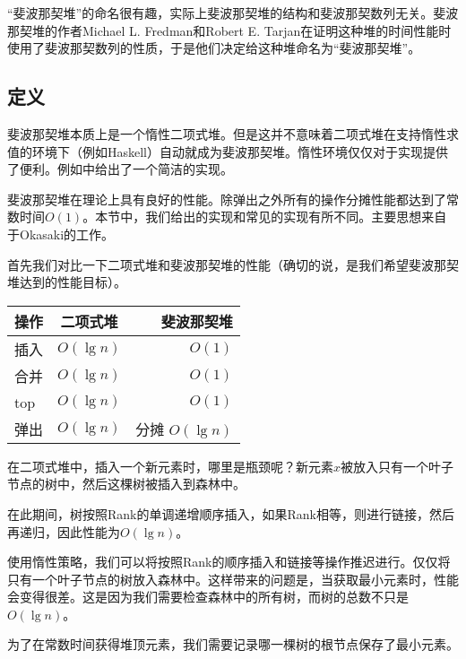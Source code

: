 \documentclass[UTF8]{article}
\begin{document}
“斐波那契堆”的命名很有趣，实际上斐波那契堆的结构和斐波那契数列无关。斐波那契堆的作者Michael L. Fredman和Robert E. Tarjan在证明这种堆的时间性能时使用了斐波那契数列的性质，于是他们决定给这种堆命名为“斐波那契堆”\cite{CLRS}。

\subsection{定义}

斐波那契堆本质上是一个惰性二项式堆。但是这并不意味着二项式堆在支持惰性求值的环境下（例如Haskell）自动就成为斐波那契堆。惰性环境仅仅对于实现提供了便利。例如\cite{hackage-fibq}中给出了一个简洁的实现。

斐波那契堆在理论上具有良好的性能。除弹出之外所有的操作分摊性能都达到了常数时间$O(1)$。本节中，我们给出的实现和常见的实现\cite{CLRS}有所不同。主要思想来自于Okasaki的工作\cite{okasaki-fibh}。

首先我们对比一下二项式堆和斐波那契堆的性能（确切的说，是我们希望斐波那契堆达到的性能目标）。

\begin{tabular}{l | c | r}
  \hline
  操作 & 二项式堆 & 斐波那契堆 \\
  \hline
  插入 & $O(\lg n)$ & $O(1)$ \\
  合并 & $O(\lg n)$ & $O(1)$ \\
  top & $O(\lg n)$ & $O(1)$ \\
  弹出 & $O(\lg n)$ & 分摊 $O(\lg n)$ \\
  \hline
\end{tabular}

在二项式堆中，插入一个新元素时，哪里是瓶颈呢？新元素$x$被放入只有一个叶子节点的树中，然后这棵树被插入到森林中。

在此期间，树按照Rank的单调递增顺序插入，如果Rank相等，则进行链接，然后再递归，因此性能为$O(\lg n)$。

使用惰性策略，我们可以将按照Rank的顺序插入和链接等操作推迟进行。仅仅将只有一个叶子节点的树放入森林中。这样带来的问题是，当获取最小元素时，性能会变得很差。这是因为我们需要检查森林中的所有树，而树的总数不只是$O(\lg n)$。

为了在常数时间获得堆顶元素，我们需要记录哪一棵树的根节点保存了最小元素。
\end{document}
